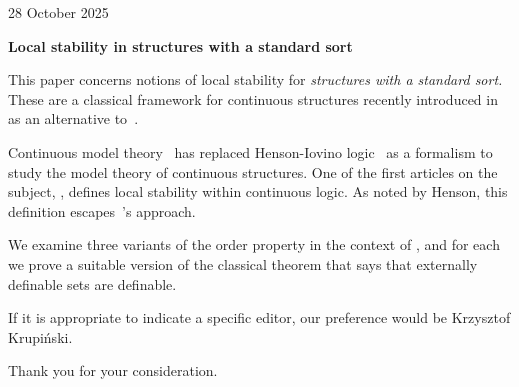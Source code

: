\documentclass{amsproc}
\author{Silvia Barbina}
\author{Riccardo Camerlo}
\author{Domenico Zambella}
\theoremstyle{mio}
\begin{document}
\hfill 28 October 2025\bigskip


\textbf{Local stability in structures with a standard sort}\bigskip

This paper concerns notions of local stability for \textit{structures with a standard sort.}
These are a classical framework for continuous structures recently introduced in \cite{clcl} as an alternative to~\cite{BBHU}.

Continuous model theory~\cite{BBHU} has replaced Henson-Iovino logic~\cite{HI} as a formalism to study the model theory of continuous structures. 
One of the first articles on the subject, \cite{BU}, defines local stability within continuous logic.
As noted by Henson, this definition escapes~\cite{HI}'s approach.

We examine three variants of the order property in the context of \cite{clcl}, and for each we prove a suitable version of the classical theorem that says that externally definable sets are definable.

If it is appropriate to indicate a specific editor, our preference would be Krzysztof Krupi\'nski.

Thank you for your consideration.

\end{document}
